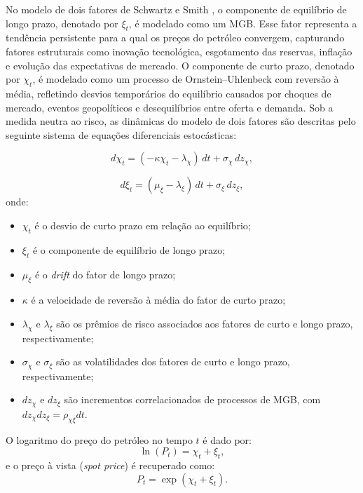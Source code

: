 No modelo de dois fatores de Schwartz e Smith \cite{20}, o componente de equilíbrio de longo prazo, denotado por $\xi_t$, é modelado como um MGB. Esse fator representa a tendência persistente para a qual os preços do petróleo convergem, capturando fatores estruturais como inovação tecnológica, esgotamento das reservas, inflação e evolução das expectativas de mercado. O componente de curto prazo, denotado por $\chi_t$, é modelado como um processo de Ornstein–Uhlenbeck com reversão à média, refletindo desvios temporários do equilíbrio causados por choques de mercado, eventos geopolíticos e desequilíbrios entre oferta e demanda. Sob a medida neutra ao risco, as dinâmicas do modelo de dois fatores são descritas pelo seguinte sistema de equações diferenciais estocásticas:

\begin{equation}
d\chi_t = (-\kappa \chi_t - \lambda_\chi) \, dt + \sigma_\chi \, dz_\chi,
\label{eq:2-42}
\end{equation}

\begin{equation}
d\xi_t = (\mu_\xi - \lambda_\xi) \, dt + \sigma_\xi \, dz_\xi,
\label{eq:2-43}
\end{equation}
onde:
\begin{itemize}
    \item $\chi_t$ é o desvio de curto prazo em relação ao equilíbrio;
    \item $\xi_t$ é o componente de equilíbrio de longo prazo;
    \item $\mu_\xi$ é o \textit{drift} do fator de longo prazo;
    \item $\kappa$ é a velocidade de reversão à média do fator de curto prazo;
    \item $\lambda_\chi$ e $\lambda_\xi$ são os prêmios de risco associados aos fatores de curto e longo prazo, respectivamente;
    \item $\sigma_\chi$ e $\sigma_\xi$ são as volatilidades dos fatores de curto e longo prazo, respectivamente;
    \item $dz_\chi$ e $dz_\xi$ são incrementos correlacionados de processos de MGB, com $dz_\chi dz_\xi = \rho_{\chi\xi} dt$.
\end{itemize}

O logaritmo do preço do petróleo no tempo $t$ é dado por:
\begin{equation}
\ln(P_t) = \chi_t + \xi_t,
\label{eq:2-44}
\end{equation}
e o preço à vista (\textit{spot price}) é recuperado como:
\begin{equation}
P_t = \exp(\chi_t + \xi_t).
\label{eq:2-45}
\end{equation}

